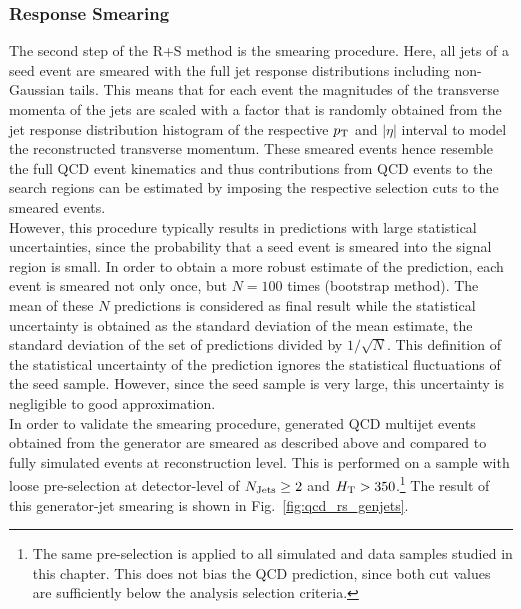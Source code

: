 \subsubsection*{Response Smearing}
\label{subsubsec:qcd_smearing}
The second step of the R+S method is the smearing procedure. Here, all jets of a seed event are smeared with the full jet response distributions including non-Gaussian tails. This means that for each event the magnitudes of the transverse momenta of the jets are scaled with a factor that is randomly obtained from the jet response distribution histogram of the respective $p_{\text{T}}$ and $|\eta|$ interval to model the reconstructed transverse momentum. These smeared events hence resemble the full QCD event kinematics and thus contributions from QCD events to the search regions can be estimated by imposing the respective selection cuts to the smeared events. \\
However, this procedure typically results in predictions with large statistical uncertainties, since the probability that a seed event is smeared into the signal region is small. In order to obtain a more robust estimate of the prediction, each event is smeared not only once, but $N = 100$ times (bootstrap method). The mean of these $N$ predictions is considered as final result while the statistical uncertainty is obtained as the standard deviation of the mean estimate, \ie the standard deviation of the set of predictions divided by $1/\sqrt{N}$. This definition of the statistical uncertainty of the prediction ignores the statistical fluctuations of the seed sample. However, since the seed sample is very large, this uncertainty is negligible to good approximation. \\
In order to validate the smearing procedure, generated QCD multijet events obtained from the \madgraph generator are smeared as described above and compared to fully simulated events at reconstruction level. This is performed on a sample with loose pre-selection at detector-level of $N_{\text{Jets}} \ge 2$ and $H_{\text{T}} > 350$\gev.\footnote{The same pre-selection is applied to all simulated and data samples studied in this chapter. This does not bias the QCD prediction, since both cut values are sufficiently below the analysis selection criteria.} The result of this generator-jet smearing is shown in Fig.~\ref{fig:qcd_rs_genjets}. 
